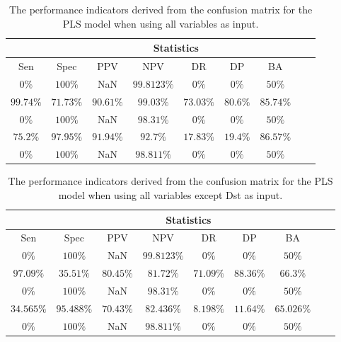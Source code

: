 \begin{table}[!ht]
	\centering
	\begin{tabular}{|c|c|c|c|c|c|c|c|c|}
		\hline
		 & \multicolumn{7}{c|}{Statistics} \\ \hline
		Sen & Spec & PPV & NPV & DR & DP & BA \\ \hline
		$0\%$ & $100\%$ & NaN & $99.8123\%$ & $0\%$ & $0\%$ & $50\%$ \\ \hline
		$99.74\%$ & $71.73\%$ & $90.61\%$ & $99.03\%$ & $73.03\%$ & $80.6\%$ & $85.74\%$ \\ \hline
		$0\%$ & $100\%$ & NaN & $98.31\%$ & $0\%$ & $0\%$ & $50\%$ \\ \hline
		$75.2\%$ & $97.95\%$ & $91.94\%$ & $92.7\%$ & $17.83\%$ & $19.4\%$ & $86.57\%$ \\ \hline
		$0\%$ & $100\%$ & NaN & $98.811\%$ & $0\%$ & $0\%$ & $50\%$ \\ \hline
	\end{tabular}
	\caption{The performance indicators derived from the confusion matrix for the PLS model when using all variables as input.}
	\label{tab:cs:all:pls}
\end{table}

\begin{table}[!ht]
	\centering
	\begin{tabular}{|c|c|c|c|c|c|c|c|c|}
		\hline
		 & \multicolumn{7}{c|}{Statistics} \\ \hline
		Sen & Spec & PPV & NPV & DR & DP & BA \\ \hline
		$0\%$ & $100\%$ & NaN & $99.8123\%$ & $0\%$ & $0\%$ & $50\%$ \\ \hline
		$97.09\%$ & $35.51\%$ & $80.45\%$ & $81.72\%$ & $71.09\%$ & $88.36\%$ & $66.3\%$ \\ \hline
		$0\%$ & $100\%$ & NaN & $98.31\%$ & $0\%$ & $0\%$ & $50\%$ \\ \hline
		$34.565\%$ & $95.488\%$ & $70.43\%$ & $82.436\%$ & $8.198\%$ & $11.64\%$ & $65.026\%$ \\ \hline
		$0\%$ & $100\%$ & NaN & $98.811\%$ & $0\%$ & $0\%$ & $50\%$ \\ \hline
	\end{tabular}
	\caption{The performance indicators derived from the confusion matrix for the PLS model when using all variables except Dst as input.}
	\label{tab:cs:noDst:pls}
\end{table}

